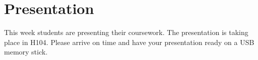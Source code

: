 \documentclass{article}
\begin{document}
\section{Presentation}
This week students are presenting their coursework.
The presentation is taking place in H104.
Please arrive on time and have your presentation ready on a USB memory stick.
\end{document}
